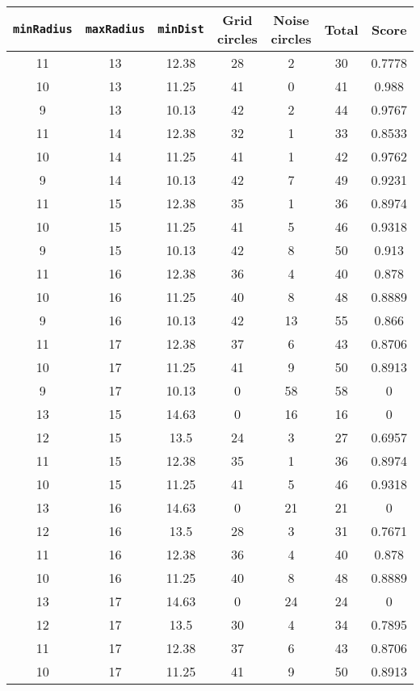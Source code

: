 \documentclass[letterpaper, 12pt]{article}
\begin{document}
\begin{longtable}{|c|c|c|c|c|c|c|}
\hline
\textbf{\texttt{minRadius}} & \textbf{\texttt{maxRadius}} & \textbf{\texttt{minDist}} & \textbf{Grid circles} & \textbf{Noise circles} & \textbf{Total} & \textbf{Score} \\
\hline
11 & 13 & 12.38 & 28 & 2 & 30 & 0.7778 \\
\hline
10 & 13 & 11.25 & 41 & 0 & 41 & 0.988 \\
\hline
9 & 13 & 10.13 & 42 & 2 & 44 & 0.9767 \\
\hline
11 & 14 & 12.38 & 32 & 1 & 33 & 0.8533 \\
\hline
10 & 14 & 11.25 & 41 & 1 & 42 & 0.9762 \\
\hline
9 & 14 & 10.13 & 42 & 7 & 49 & 0.9231 \\
\hline
11 & 15 & 12.38 & 35 & 1 & 36 & 0.8974 \\
\hline
10 & 15 & 11.25 & 41 & 5 & 46 & 0.9318 \\
\hline
9 & 15 & 10.13 & 42 & 8 & 50 & 0.913 \\
\hline
11 & 16 & 12.38 & 36 & 4 & 40 & 0.878 \\
\hline
10 & 16 & 11.25 & 40 & 8 & 48 & 0.8889 \\
\hline
9 & 16 & 10.13 & 42 & 13 & 55 & 0.866 \\
\hline
11 & 17 & 12.38 & 37 & 6 & 43 & 0.8706 \\
\hline
10 & 17 & 11.25 & 41 & 9 & 50 & 0.8913 \\
\hline
9 & 17 & 10.13 & 0 & 58 & 58 & 0 \\
\hline
13 & 15 & 14.63 & 0 & 16 & 16 & 0 \\
\hline
12 & 15 & 13.5 & 24 & 3 & 27 & 0.6957 \\
\hline
11 & 15 & 12.38 & 35 & 1 & 36 & 0.8974 \\
\hline
10 & 15 & 11.25 & 41 & 5 & 46 & 0.9318 \\
\hline
13 & 16 & 14.63 & 0 & 21 & 21 & 0 \\
\hline
12 & 16 & 13.5 & 28 & 3 & 31 & 0.7671 \\
\hline
11 & 16 & 12.38 & 36 & 4 & 40 & 0.878 \\
\hline
10 & 16 & 11.25 & 40 & 8 & 48 & 0.8889 \\
\hline
13 & 17 & 14.63 & 0 & 24 & 24 & 0 \\
\hline
12 & 17 & 13.5 & 30 & 4 & 34 & 0.7895 \\
\hline
11 & 17 & 12.38 & 37 & 6 & 43 & 0.8706 \\
\hline
10 & 17 & 11.25 & 41 & 9 & 50 & 0.8913 \\

\end{longtable}
\end{document}
